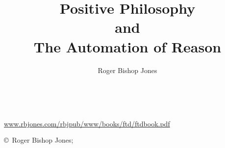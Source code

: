 \documentclass[10pt,titlepage]{book}
\author{Roger Bishop Jones}
\title{Positive Philosophy\\ and\\ The Automation of Reason}
\begin{document}
\frontmatter

\begin{titlepage}
\maketitle

\ 
\\

\vfill

\begin{centering}

{\footnotesize



\href{http://www.rbjones.com/rbjpub/www/books/ftd/ftdbook.pdf}{www.rbjones.com/rbjpub/www/books/ftd/ftdbook.pdf}


\copyright\ Roger Bishop Jones;

}%

\end{centering}

\thispagestyle{empty}
\end{titlepage}


{\parskip=0pt\tableofcontents}
\end{document}
